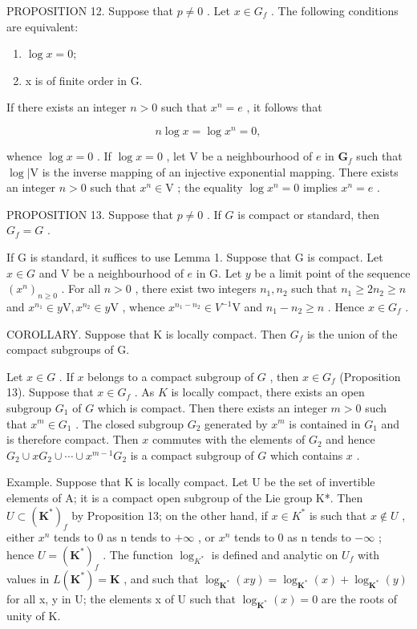 PROPOSITION 12. Suppose that \(p \neq 0\) . Let \(x \in G_f\) . The following conditions are equivalent:

\begin{enumerate}
\def\labelenumi{(\roman{enumi})}
\item
  \(\log x = 0;\)
\item
  x is of finite order in G.
\end{enumerate}

If there exists an integer \(n > 0\) such that \(x^n = e\) , it follows that

\[
n \log x = \log x ^ {n} = 0,
\]

whence \(\log x = 0\) . If \(\log x = 0\) , let \(\mathrm{V}\) be a neighbourhood of \(e\) in \(\mathbf{G}_f\) such that \(\log |\mathrm{V}\) is the inverse mapping of an injective exponential mapping. There exists an integer \(n > 0\) such that \(x^n \in \mathrm{V}\) ; the equality \(\log x^n = 0\) implies \(x^n = e\) .

PROPOSITION 13. Suppose that \(p \neq 0\) . If \(G\) is compact or standard, then \(G_f = G\) .

If G is standard, it suffices to use Lemma 1. Suppose that G is compact. Let \(x \in G\) and V be a neighbourhood of \(e\) in G. Let \(y\) be a limit point of the sequence \((x^n)_{n \geqslant 0}\) . For all \(n > 0\) , there exist two integers \(n_1, n_2\) such that \(n_1 \geqslant 2n_2 \geqslant n\) and \(x^{n_1} \in y\mathrm{V}, x^{n_2} \in y\mathrm{V}\) , whence \(x^{n_1 - n_2} \in V^{-1}\mathrm{V}\) and \(n_1 - n_2 \geqslant n\) . Hence \(x \in G_f\) .

COROLLARY. Suppose that K is locally compact. Then \(G_{f}\) is the union of the compact subgroups of G.

Let \(x \in G\) . If \(x\) belongs to a compact subgroup of \(G\) , then \(x \in G_f\) (Proposition 13). Suppose that \(x \in G_f\) . As \(K\) is locally compact, there exists an open subgroup \(G_1\) of \(G\) which is compact. Then there exists an integer \(m > 0\) such that \(x^m \in G_1\) . The closed subgroup \(G_2\) generated by \(x^m\) is contained in \(G_1\) and is therefore compact. Then \(x\) commutes with the elements of \(G_2\) and hence \(G_2 \cup xG_2 \cup \cdots \cup x^{m-1}G_2\) is a compact subgroup of \(G\) which contains \(x\) .

Example. Suppose that K is locally compact. Let U be the set of invertible elements of A; it is a compact open subgroup of the Lie group K*. Then \(U \subset (\mathbf{K}^{*})_{f}\) by Proposition 13; on the other hand, if \(x \in K^{*}\) is such that \(x \notin U\) , either \(x^{n}\) tends to 0 as n tends to \(+\infty\) , or \(x^{n}\) tends to 0 as n tends to \(-\infty\) ; hence \(U = (\mathbf{K}^{*})_{f}\) . The function \(\log_{K^{*}}\) is defined and analytic on \(U_{f}\) with values in \(L(\mathbf{K}^{*}) = \mathbf{K}\) , and such that \(\log_{\mathbf{K}^{*}}(xy) = \log_{\mathbf{K}^{*}}(x) + \log_{\mathbf{K}^{*}}(y)\) for all x, y in U; the elements x of U such that \(\log_{\mathbf{K}^{*}}(x) = 0\) are the roots of unity of K.

